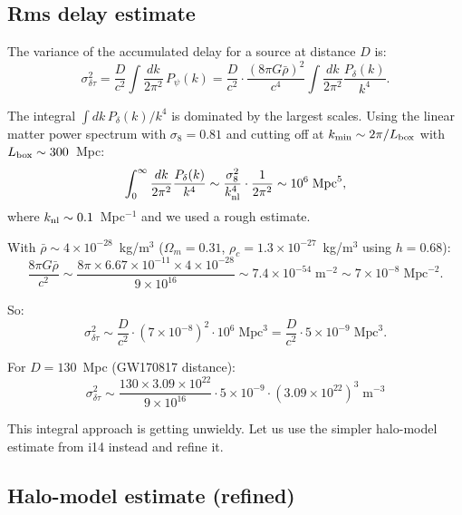 \documentclass[11pt]{article}
\newcommand{\ee}[1]{\times 10^{#1}}
\begin{document}
\subsection{Rms delay estimate}

The variance of the accumulated delay for a source at distance $D$ is:
\begin{equation}
\sigma_{\delta\tau}^2 = \frac{D}{c^2}\int \frac{dk}{2\pi^2}\,P_\psi(k)
= \frac{D}{c^2}\cdot\frac{(8\pi G\bar{\rho})^2}{c^4}
\int\frac{dk}{2\pi^2}\frac{P_\delta(k)}{k^4}.
\end{equation}

The integral $\int dk\,P_\delta(k)/k^4$ is dominated by the largest
scales. Using the linear matter power spectrum with
$\sigma_8 = 0.81$ and cutting off at $k_{\rm min} \sim 2\pi/L_{\rm box}$
with $L_{\rm box} \sim 300$~Mpc:
\begin{equation}
\int_0^\infty \frac{dk}{2\pi^2}\frac{P_\delta(k)}{k^4}
\sim \frac{\sigma_8^2}{k_{\rm nl}^4}\cdot\frac{1}{2\pi^2}
\sim 10^{6}\;\text{Mpc}^5,
\end{equation}
where $k_{\rm nl} \sim 0.1$~Mpc$^{-1}$ and we used a rough estimate.

With $\bar{\rho} \sim 4\ee{-28}$~kg/m$^3$ ($\Omega_m = 0.31$,
$\rho_c = 1.3\ee{-27}$~kg/m$^3$ using $h = 0.68$):
\begin{equation}
\frac{8\pi G\bar{\rho}}{c^2} \sim \frac{8\pi \times 6.67\ee{-11}
\times 4\ee{-28}}{9\ee{16}} \sim 7.4\ee{-54}\;\text{m}^{-2}
\sim 7\ee{-8}\;\text{Mpc}^{-2}.
\end{equation}

So:
\begin{equation}
\sigma_{\delta\tau}^2 \sim \frac{D}{c^2}\cdot(7\ee{-8})^2\cdot 10^6
\;\text{Mpc}^3 = \frac{D}{c^2}\cdot 5\ee{-9}\;\text{Mpc}^3.
\end{equation}

For $D = 130$~Mpc (GW170817 distance):
\begin{equation}
\sigma_{\delta\tau}^2 \sim \frac{130\times 3.09\ee{22}}{9\ee{16}}
\cdot 5\ee{-9}\cdot(3.09\ee{22})^3\;\text{m}^{-3}
\end{equation}

This integral approach is getting unwieldy. Let us use the simpler
halo-model estimate from i14 instead and refine it.

\subsection{Halo-model estimate (refined)}
\end{document}
